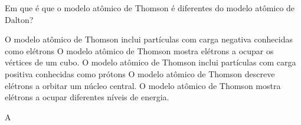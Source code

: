 \documentclass[11pt]{article}
\begin{document}
\begin{exercise}
Em que é que o modelo atômico de Thomson é diferentes do modelo atômico de Dalton?

\begin{choice}
\choice O modelo atômico de Thomson inclui partículas com carga negativa conhecidas como elétrons
\choice O modelo atômico de Thomson mostra elétrons a ocupar os vértices de um cubo.
\choice O modelo atômico de Thomson inclui partículas com carga positiva conhecidas como prótons
\choice O modelo atômico de Thomson descreve elétrons a orbitar um núcleo central.
\choice O modelo atômico de Thomson mostra elétrons a ocupar diferentes níveis de energia.
\end{choice}
\end{exercise}
\begin{solution}
A
\end{solution}











\end{document}
